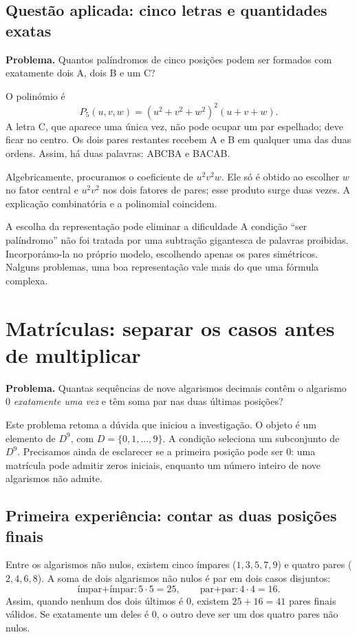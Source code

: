 \documentclass[11pt,a4paper,oneside]{book}
\newcommand{\rom}[1]{\textsc{#1}}
\begin{document}
\section{Questão aplicada: cinco letras e quantidades exatas}
\textbf{Problema.} Quantos palíndromos de cinco posições podem ser formados com exatamente dois A, dois B e um C?

O polinómio é
\[P_5(u,v,w)=(u^2+v^2+w^2)^2(u+v+w).\]
A letra C, que aparece uma única vez, não pode ocupar um par espelhado; deve ficar no centro. Os dois pares restantes recebem A e B em qualquer uma das duas ordens. Assim, há duas palavras: \rom{ABCBA} e \rom{BACAB}.

Algebricamente, procuramos o coeficiente de $u^2v^2w$. Ele só é obtido ao escolher $w$ no fator central e $u^2v^2$ nos dois fatores de pares; esse produto surge duas vezes. A explicação combinatória e a polinomial coincidem.
\begin{descobertabox}{A escolha da representação pode eliminar a dificuldade}
A condição ``ser palíndromo'' não foi tratada por uma subtração gigantesca de palavras proibidas. Incorporámo-la no próprio modelo, escolhendo apenas os pares simétricos. Nalguns problemas, uma boa representação vale mais do que uma fórmula complexa.
\end{descobertabox}

\chapter{Matrículas: separar os casos antes de multiplicar}
\textbf{Problema.} Quantas sequências de nove algarismos decimais contêm o algarismo 0 \emph{exatamente uma vez} e têm soma par nas duas últimas posições?

Este problema retoma a dúvida que iniciou a investigação. O objeto é um elemento de $D^9$, com $D=\{0,1,\ldots,9\}$. A condição seleciona um subconjunto de $D^9$. Precisamos ainda de esclarecer se a primeira posição pode ser 0: uma matrícula pode admitir zeros iniciais, enquanto um número inteiro de nove algarismos não admite.
\section{Primeira experiência: contar as duas posições finais}
Entre os algarismos não nulos, existem cinco ímpares ($1,3,5,7,9$) e quatro pares ($2,4,6,8$). A soma de dois algarismos não nulos é par em dois casos disjuntos:
\[
\text{ímpar+ímpar}:5\cdot5=25,\qquad
\text{par+par}:4\cdot4=16.
\]
Assim, quando nenhum dos dois últimos é 0, existem $25+16=41$ pares finais válidos. Se exatamente um deles é 0, o outro deve ser um dos quatro pares não nulos.
\end{document}

